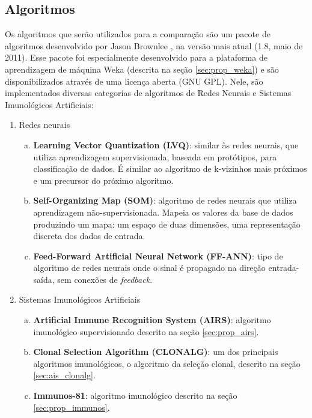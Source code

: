 \subsection{Algoritmos}

Os algoritmos que serão utilizados para a comparação são um pacote de algoritmos desenvolvido por Jason Brownlee \cite{Brownlee2011w}, na versão mais atual (1.8, maio de 2011). Esse pacote foi especialmente desenvolvido para a plataforma de aprendizagem de máquina Weka (descrita na seção \ref{sec:prop_weka}) e são disponibilizados através de uma licença aberta (GNU GPL). Nele, são implementados diversas categorias de algoritmos de Redes Neurais e Sistemas Imunológicos Artificiais:

\begin{enumerate}
    \item Redes neurais
    \begin{enumerate}[a)]
        \item \textbf{Learning Vector Quantization (LVQ)}: similar às redes neurais, que utiliza aprendizagem supervisionada, baseada em protótipos, para classificação de dados. É similar ao algoritmo de k-vizinhos mais próximos e um precursor do próximo algoritmo.
        \item \textbf{Self-Organizing Map (SOM)}: algoritmo de redes neurais que utiliza aprendizagem não-supervisionada. Mapeia os valores da base de dados produzindo um mapa: um espaço de duas dimensões, uma representação discreta dos dados de entrada.
        \item \textbf{Feed-Forward Artificial Neural Network (FF-ANN)}: tipo de algoritmo de redes neurais onde o sinal é propagado na direção entrada-saída, sem conexões de \emph{feedback}.
    \end{enumerate}
    \item Sistemas Imunológicos Artificiais
    \begin{enumerate}[a)]
        \item \textbf{Artificial Immune Recognition System (AIRS)}: algoritmo imunológico supervisionado descrito na seção \ref{sec:prop_airs}.
        \item \textbf{Clonal Selection Algorithm (CLONALG)}: um dos principais algoritmos imunológicos, o algoritmo da seleção clonal, descrito na seção \ref{sec:ais_clonalg}.
        \item \textbf{Immunos-81}: algoritmo imunológico descrito na seção \ref{sec:prop_immunos}.
    \end{enumerate}
\end{enumerate}

